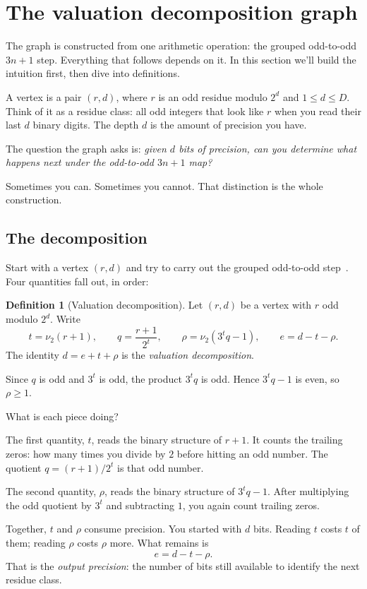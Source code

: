 \documentclass[11pt]{amsart}
\theoremstyle{definition}
\newtheorem{definition}[theorem]{Definition}
\theoremstyle{remark}
\newcommand{\nuu}{\nu_2}
\begin{document}
\section{The valuation decomposition graph}\label{sec:valuation}\label{sec:graph}
The graph is constructed from one arithmetic operation: the grouped odd-to-odd $3n+1$ step. Everything that follows depends on it. In this section we'll build the intuition first, then dive into definitions.

A vertex is a pair $(r,d)$, where $r$ is an odd residue modulo $2^d$ and $1\le d\le D$.  Think of it as a residue class: all odd integers that look like $r$ when you read their last $d$ binary digits.  The depth $d$ is the amount of precision you have.

The question the graph asks is: \emph{given $d$ bits of precision, can you determine what happens next under the odd-to-odd $3n+1$ map?}

Sometimes you can.  Sometimes you cannot.  That distinction is the whole construction.

\subsection{The decomposition}
Start with a vertex $(r,d)$ and try to carry out the grouped odd-to-odd step~\cite{Wirsching1998}.  Four quantities fall out, in order:

\begin{definition}[Valuation decomposition]\label{def:valuation}
Let $(r,d)$ be a vertex with $r$ odd modulo $2^d$.  Write
\[
t=\nuu(r+1),\qquad q=\frac{r+1}{2^t},\qquad
\rho=\nuu(3^tq-1),\qquad e=d-t-\rho.
\]
The identity $d=e+t+\rho$ is the \emph{valuation decomposition}.

Since \(q\) is odd and \(3^t\) is odd, the product \(3^tq\) is odd. Hence \(3^tq-1\) is even, so \(\rho\ge1\).
\end{definition}



What is each piece doing?

The first quantity, $t$, reads the binary structure of $r+1$.  It counts the trailing zeros: how many times you divide by $2$ before hitting an odd number.  The quotient $q=(r+1)/2^t$ is that odd number.

The second quantity, $\rho$, reads the binary structure of $3^tq-1$.  After multiplying the odd quotient by $3^t$ and subtracting $1$, you again count trailing zeros.

Together, $t$ and $\rho$ consume precision.  You started with $d$ bits.  Reading $t$ costs $t$ of them; reading $\rho$ costs $\rho$ more.  What remains is
\[
e=d-t-\rho.
\]
That is the \emph{output precision}: the number of bits still available to identify the next residue class.
\end{document}
